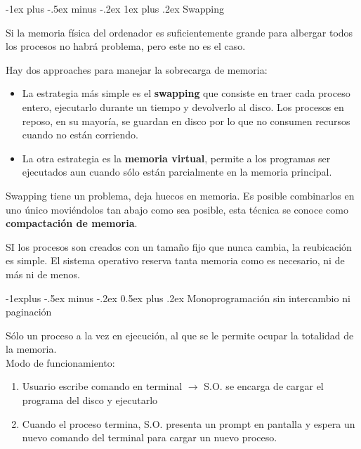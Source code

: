 \documentclass[10pt,portrait, twocolumn]{article}
\makeatletter
\renewcommand{\subsection}{\@startsection{subsection}{2}{0mm}%
                                {-1explus -.5ex minus -.2ex}%
                                {0.5ex plus .2ex}%
                                {\normalfont\normalsize\bfseries}}
\renewcommand{\subsubsection}{\@startsection{subsubsection}{3}{0mm}%
                                {-1ex plus -.5ex minus -.2ex}%
                                {1ex plus .2ex}%
                                {\normalfont\small\bfseries}}
\makeatother
\begin{document}
\subsubsection{Swapping}

Si la memoria física del ordenador es suficientemente grande para albergar todos los procesos no habrá problema, pero este no es el caso. 

	\quad Hay dos approaches para manejar la sobrecarga de memoria:
	
	\begin{itemize}
		\item La estrategia más simple es el \textbf{swapping} que consiste en traer cada proceso entero, ejecutarlo durante un tiempo y devolverlo al disco. Los procesos en reposo, en su mayoría, se guardan en disco por lo que no consumen recursos cuando no están corriendo.
		\item La otra estrategia es la \textbf{memoria virtual}, permite a los programas ser ejecutados aun cuando sólo están parcialmente en la memoria principal.
	\end{itemize}	
	
Swapping tiene un problema, deja huecos en memoria. Es posible combinarlos en uno único moviéndolos tan abajo como sea posible, esta técnica se conoce como \textbf{compactación de memoria}.

	\quad SI los procesos son creados con un tamaño fijo que nunca cambia, la reubicación es simple. El sistema operativo reserva tanta memoria como es necesario, ni de más ni de menos.	
	
\subsection{Monoprogramación sin intercambio ni paginación}

Sólo un proceso a la vez en ejecución, al que se le permite ocupar la totalidad de la memoria.\\

Modo de funcionamiento:

	\begin{enumerate}
	\item Usuario escribe comando en terminal $\rightarrow$ S.O. se encarga de cargar el programa del disco y ejecutarlo
	\item Cuando el proceso termina, S.O. presenta un prompt en pantalla y espera un nuevo comando del terminal para cargar un nuevo proceso.
	\end{enumerate}
	
\end{document}
